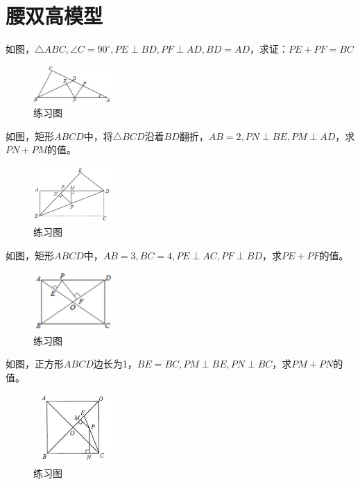 \documentclass{ecnuthesis}
\begin{document}
\section{腰双高模型}
\begin{problem}
    如图，$\triangle ABC,\angle C=90^\circ,PE\perp BD,PF\perp AD,BD=AD$，求证：$PE+PF=BC$
\end{problem}
\begin{figure}[H]
\centering
\includegraphics[width=3cm]{picture/655.png}
\caption{练习图}
\end{figure}
\begin{problem}
    如图，矩形$ABCD$中，将$\triangle BCD$沿着$BD$翻折，$AB=2,PN\perp BE,PM\perp AD$，求$PN+PM$的值。
\end{problem}
\begin{figure}[H]
\centering
\includegraphics[width=3cm]{picture/656.png}
\caption{练习图}
\end{figure}
\begin{problem}
    如图，矩形$ABCD$中，$AB=3,BC=4,PE\perp AC, PF\perp BD$，求$PE+PF$的值。
\end{problem}
\begin{figure}[H]
\centering
\includegraphics[width=3cm]{picture/657.png}
\caption{练习图}
\end{figure}
\begin{problem}
    如图，正方形$ABCD$边长为1，$BE=BC,PM\perp BE, PN\perp BC$，求$PM+PN$的值。
\end{problem}
\begin{figure}[H]
\centering
\includegraphics[width=3cm]{picture/658.png}
\caption{练习图}
\end{figure}
\clearpage
\end{document}

